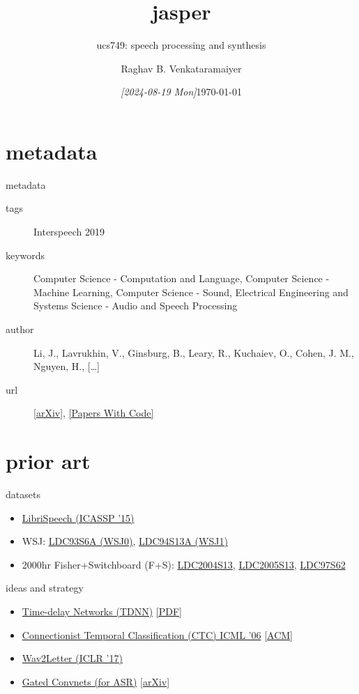 \documentclass[aspectratio=169,xcolor={dvipsnames,svgnames}]{beamer}
\date{\textit{[2024-08-19 Mon]}}
\title{jasper}
\subtitle{ucs749: speech processing and synthesis}
\author{%
\normalsize Raghav B. Venkataramaiyer
}
\institute{%
CSED TIET Patiala India.
}
\date{\scriptsize \today}
\begin{document}
\maketitle

\section{metadata}
\label{sec:org9f628d1}

\begin{frame}[label={sec:org0869d09}]{metadata}
\begin{description}
\item[{tags}] Interspeech 2019
\item[{keywords}] Computer Science - Computation and
Language, Computer Science - Machine Learning,
Computer Science - Sound, Electrical Engineering and
Systems Science - Audio and Speech Processing
\item[{author}] Li, J., Lavrukhin, V., Ginsburg, B., Leary,
R., Kuchaiev, O., Cohen, J. M., Nguyen, H., […]
\item[{url}] \href{http://arxiv.org/abs/1904.03288}{[arXiv]​}, \href{https://paperswithcode.com/paper/jasper-an-end-to-end-convolutional-neural\#code}{[Papers With Code]​}
\end{description}
\end{frame}

\section{prior art}
\label{sec:prior-art}
\begin{frame}[label={sec:datasets}]{datasets}
\begin{itemize}
\item \href{https://doi.org/10.1109/ICASSP.2015.7178964}{LibriSpeech (ICASSP ’15)}
\item WSJ: \href{https://doi.org/10.35111/ewkm-cg47}{LDC93S6A (WSJ0)}, \href{https://doi.org/10.35111/q7sb-vv12}{LDC94S13A (WSJ1)}
\item 2000hr Fisher+Switchboard (F+S): \href{https://doi.org/10.35111/da4a-se30}{LDC2004S13},
\href{https://doi.org/10.35111/dz78-gx84}{LDC2005S13}, \href{https://doi.org/10.35111/sw3h-rw02}{LDC97S62}
\end{itemize}
\end{frame}


\begin{frame}[label={sec:ideas-and-strategy}]{ideas and strategy}
\begin{itemize}
\item \href{../time-delay-networks/}{Time-delay Networks (TDNN)} \href{https://www.cs.toronto.edu/\~hinton/absps/langTDNN.pdf}{[PDF}]
\item \href{../ctc/}{Connectionist Temporal Classification (CTC) ICML ’06}
\href{https://dl.acm.org/doi/abs/10.1145/1143844.1143891}{[ACM}]
\item \href{https://arxiv.org/abs/1609.03193}{Wav2Letter (ICLR '17)}
\item \hyperlink{sec:gated-activation-unit}{Gated Convnets (for ASR)} \href{https://arxiv.org/abs/1712.09444}{[arXiv}]
\end{itemize}
\end{frame}
\end{document}

